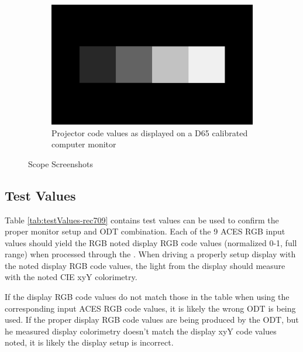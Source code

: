 \begin{figure}[ht!]
\begin{subfigure}[b]{0.475\textwidth}
            \includegraphics[width=\textwidth]{images/rec709/rec709_image}
            \caption[Projector code values as displayed on a D65 calibrated computer monitor]%
            {{\small Projector code values as displayed on a D65 calibrated computer monitor}}    
            \label{fig:cv-rec709}
        \end{subfigure}
        \caption[]
        {\small \texttt{} Scope Screenshots} 
        \label{fig:screenshots-rec709}
    \end{figure}

\subsection{Test Values}
\label{subsec:testValues-rec709}

Table \ref{tab:testValues-rec709} contains test values can be used to confirm the proper monitor setup and ODT combination.  Each of the 9 ACES RGB input values should yield the RGB noted display RGB code values (normalized 0-1, full range) when processed through the \texttt{}. When driving a properly setup display with the noted display RGB code values, the light from the display should measure with the noted CIE xyY colorimetry.  

If the display RGB code values do not match those in the table when using the corresponding input ACES RGB code values, it is likely the wrong ODT is being used.  If the proper display RGB code values are being produced by the ODT, but he measured display colorimetry doesn't match the display xyY code values noted, it is likely the display setup is incorrect.

